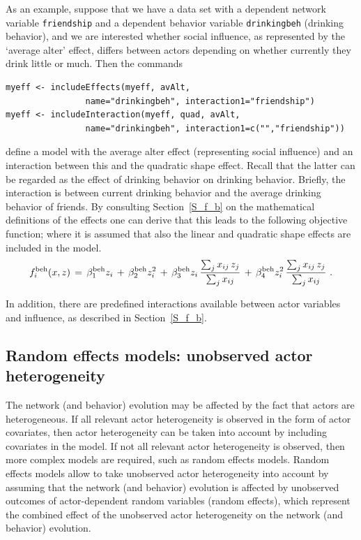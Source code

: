 \documentclass[a4paper,fleqn,11pt]{article}
\newcommand{\+}{\, + \,}
\begin{document}
{As an example, suppose that we have a data set with a dependent
network variable \texttt{friendship} and a dependent behavior variable
\texttt{drinkingbeh} (drinking behavior), and we are interested whether
social influence, as represented by the `average alter' effect, differs
between actors depending on whether currently they drink little or much.
Then the commands
\begin{verbatim}
myeff <- includeEffects(myeff, avAlt,
                name="drinkingbeh", interaction1="friendship")
myeff <- includeInteraction(myeff, quad, avAlt,
                name="drinkingbeh", interaction1=c("","friendship"))
\end{verbatim}
define a model with the average alter effect (representing social influence)
and an interaction between this and the quadratic shape effect.
Recall that the latter can be regarded
as the effect of drinking behavior on drinking behavior.
Briefly, the interaction is between current drinking behavior
and the average drinking behavior of friends.
By consulting Section~\ref{S_f_b} on the mathematical definitions of the
effects one can derive that this leads to the following objective function;
where it is assumed that also the linear and quadratic shape effects are
included in the model.
\[
f^{\rm beh}_i(x, z) \,=\, \beta^{\rm beh}_1 z_i \,+\, \beta^{\rm beh}_2 z_i^2
        \,+\, \beta^{\rm beh}_3 z_i \,
        \frac{ \sum_j x_{ij}\, z_j }{\sum_j x_{ij}}
       \,+\, \beta^{\rm beh}_4 z_i^2 \,
              \frac{ \sum_j x_{ij}\, z_j }{\sum_j x_{ij}} \ .
\]
\medskip

In addition, there are predefined interactions available
between actor variables and influence, as described in Section~\ref{S_f_b}.

\iffalse
\subsection{Random effects models: unobserved actor heterogeneity}

The network (and behavior) evolution may be affected
by the fact that actors are heterogeneous.
If all relevant actor heterogeneity is observed in the form of actor
covariates,
then actor heterogeneity can be taken into account by including
covariates in the model.
If not all relevant actor heterogeneity is observed,
then more complex models are required, such as random effects models.
Random effects models \citep[see][]{SchweinbergerSnijders07b} allow to take
unobserved actor heterogeneity into account
by assuming that the network (and behavior) evolution is affected
by unobserved
outcomes of actor-dependent random variables (random effects),
which represent the combined effect of the unobserved actor
heterogeneity on the network (and behavior) evolution.

}
\end{document}
